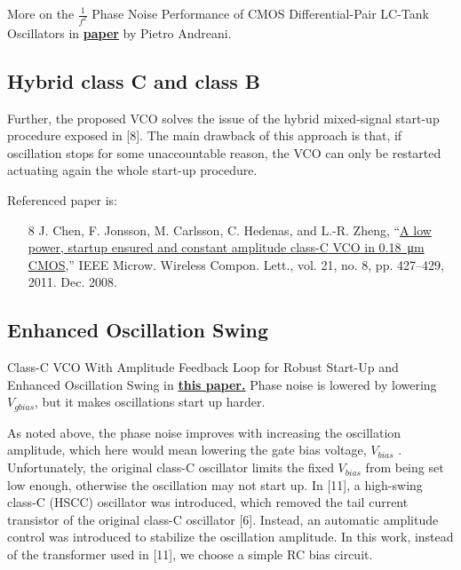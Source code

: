 More on the $\frac{1}{f^2}$ Phase Noise Performance of CMOS Differential-Pair LC-Tank Oscillators in \href{https://backend.orbit.dtu.dk/ws/files/3913656/Andreani.pdf}{\textbf{paper}} by Pietro Andreani.


\subsection{Hybrid class C and class B}

\begin{info}
Further, the proposed VCO solves the issue of the hybrid mixed-signal start-up procedure exposed in [8]. The main drawback of this approach is that, if oscillation stops for some unaccountable reason, the VCO can only be restarted actuating again the whole start-up procedure.
\end{info}

Referenced paper is:

\begin{itemize}
	\item [8] J. Chen, F. Jonsson, M. Carlsson, C. Hedenas, and L.-R. Zheng, “\href{https://ieeexplore.ieee.org/document/5951800}{A low power, startup ensured and constant amplitude class-C VCO in \SI{0.18}{\micro\metre} CMOS},” IEEE Microw. Wireless Compon. Lett., vol. 21, no. 8, pp. 427–429, 2011. Dec. 2008.
\end{itemize}


\subsection{Enhanced Oscillation Swing}

Class-C VCO With Amplitude Feedback Loop for Robust Start-Up and Enhanced Oscillation Swing in \href{https://ieeexplore.ieee.org/stamp/stamp.jsp?arnumber=6377236}{\textbf{this paper.}} Phase noise is lowered by lowering $V_{gbias}$, but it makes oscillations start up harder.

\begin{info}
As noted above, the phase noise improves with increasing the oscillation amplitude, which here would mean lowering the gate bias voltage, $V_{bias}$ . Unfortunately, the original class-C oscillator limits the fixed $V_{bias}$ from being set low enough, otherwise the oscillation may not start up. In [11], a high-swing class-C (HSCC) oscillator was introduced, which removed the tail current transistor of the original class-C oscillator [6]. Instead, an automatic amplitude control was introduced to stabilize the oscillation amplitude. In this work, instead of the transformer used in [11], we choose a simple RC bias circuit.
\end{info}

